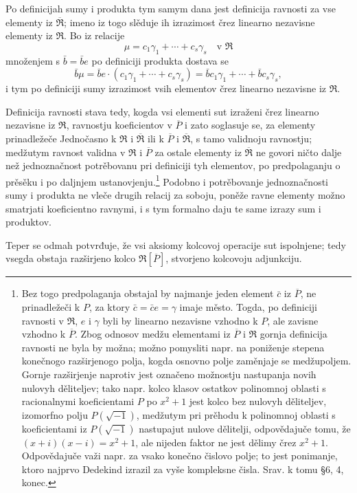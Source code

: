 \documentclass[11pt]{article}
\begin{document}
Po definicijah sumy i produkta tym samym dana jest definicija ravnosti za vse elementy iz $\overline{\mathfrak R}$; imeno iz togo slěduje ih izrazimost črez linearno nezavisne elementy iz $\mathfrak R$. Bo iz relacije
\[
   \mu=c_1\gamma_1+\cdots+c_s\gamma_s\quad\text{v }\mathfrak R
\]
množenjem s $\bar b=\bar b e$ po definiciji produkta dostava se
\[
   \bar b\mu=\bar b e\cdot(c_1\gamma_1+\cdots+c_s\gamma_s)
      =\bar b c_1\gamma_1+\cdots+\bar b c_s\gamma_s,
\]
i tym po definiciji sumy izrazimost vsih elementov črez linearno nezavisne iz $\mathfrak R$.

Definicija ravnosti stava tedy, kogda vsi elementi sut izraženi črez linearno nezavisne iz $\mathfrak R$, ravnostju koeficientov v $\overline P$ i zato soglasuje se, za elementy prinadležeče Jednočasno k $\mathfrak R$ i $\overline{\mathfrak R}$ ili k $\overline P$ i $\overline{\mathfrak R}$, s tamo validnoju ravnostju; medžutym ravnost validna v $\mathfrak R$ i $\overline P$ za ostale elementy iz $\overline{\mathfrak R}$ ne govori ničto dalje než jednoznačnost potrěbovanu pri definiciji tyh elementov, po predpolaganju o prěsěku i po daljnjem ustanovjenju.\footnote{Bez togo predpolaganja obstajal by najmanje jeden element $\bar c$ iz $\overline P$, ne prinadležeči k $P$, za ktory $\bar c=\bar c e=\gamma$ imaje město. Togda, po definiciji ravnosti v $\mathfrak R$, $e$ i $\gamma$ byli by linearno nezavisne vzhodno k $P$, ale zavisne vzhodno k $\overline P$. Zbog odnosov medžu elementami iz $\overline P$ i $\mathfrak R$ gornja definicija ravnosti ne byla by možna; možno pomysliti napr. na poniženje stepena konečnogo razširjenogo polja, kogda osnovno polje zaměnjaje se medžupoljem. Gornje razširjenje naprotiv jest označeno možnostju nastupanja novih nulovyh děliteljev; tako napr. kolco klasov ostatkov polinomnoj oblasti s racionalnymi koeficientami $P$ po $x^2+1$ jest kolco bez nulovyh děliteljev, izomorfno polju $P(\sqrt{-1})$, medžutym pri prěhodu k polinomnoj oblasti s koeficientami iz $P(\sqrt{-1})$ nastupajut nulove dělitelji, odpovědajuče tomu, že $(x+i)(x-i)=x^2+1$, ale nijeden faktor ne jest dělimy črez $x^2+1$. Odpovědajuče važi napr. za vsako konečno čislovo polje; to jest ponimanje, ktoro najprvo Dedekind izrazil za vyše kompleksne čisla. Srav. k tomu \S 6, 4, konec.} Podobno i potrěbovanje jednoznačnosti sumy i produkta ne vleče drugih relacij za soboju, poněže ravne elementy možno smatrjati koeficientno ravnymi, i s tym formalno daju te same izrazy sum i produktov.

Teper se odmah potvrđuje, že vsi aksiomy kolcovoj operacije sut ispolnjene; tedy vsegda obstaja razširjeno kolco $\mathfrak R[\overline P]$, stvorjeno kolcovoju adjunkciju.
\end{document}
